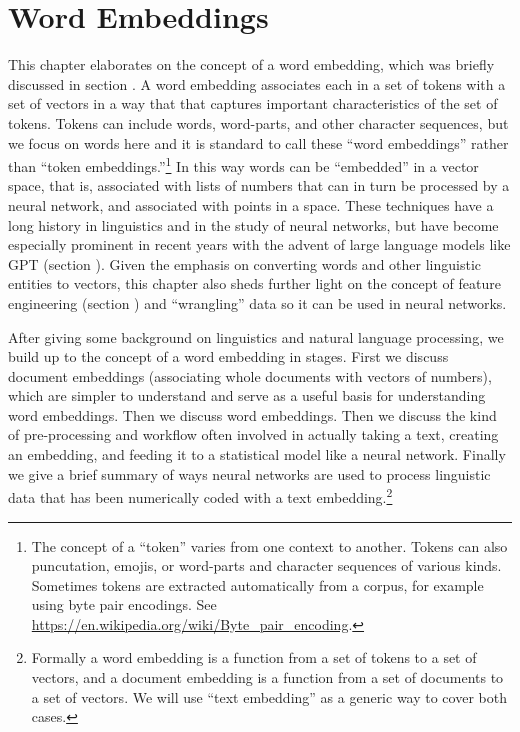 \chapter{Word Embeddings}\label{ch_word_embeddings}


This chapter elaborates on the concept of a word embedding, which was briefly discussed in section . A word embedding associates each  in a set of tokens with a set of vectors in a way that that captures important characteristics of the set of tokens. Tokens can include words, word-parts, and other character sequences, but we focus on words here and it is standard to call these ``word embeddings'' rather than ``token embeddings.''\footnote{The concept of a ``token'' varies from one context to another. Tokens can also puncutation, emojis, or word-parts and character sequences of various kinds. Sometimes tokens are extracted automatically from a corpus, for example using byte pair encodings.  See \url{https://en.wikipedia.org/wiki/Byte_pair_encoding}.} In this way words can be ``embedded'' in a vector space, that is, associated with lists of numbers that can in turn be processed by a neural network, and associated with points in a space. These techniques have a long history in linguistics and in the study of neural networks, but have become especially prominent in recent years with the advent of large language models like GPT (section ). Given the emphasis on converting words and other linguistic entities to vectors, this chapter also sheds further light on the concept of feature engineering (section ) and ``wrangling'' data so it can be used in neural networks.

After giving some background on linguistics and natural language processing, we build up to the concept of a word embedding in stages. First we discuss document embeddings (associating whole documents with vectors of numbers), which are simpler to understand and serve as a useful basis for understanding word embeddings.  Then we discuss word embeddings. Then we discuss the kind of pre-processing and workflow often involved in actually taking a text, creating an embedding, and feeding it to a statistical model like a neural network. Finally we give a brief summary of ways neural networks are used to process linguistic data that has been numerically coded with a text embedding.\footnote{Formally a word embedding is a function from a set of tokens to a set of vectors, and a document embedding is a function from a set of documents to a set of vectors.  We will use ``text embedding'' as a generic way to cover both cases.}

